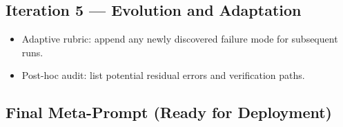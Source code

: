 \documentclass[11pt,a4paper]{article}
\numberwithin{equation}{section}
\begin{document}
\subsection*{Iteration 5 --- Evolution and Adaptation}
\begin{summarybox}[title={Changes Introduced: Adaptive Rubric and Post-Hoc Audit}]
\begin{itemize}
  \item Adaptive rubric: append any newly discovered failure mode for subsequent runs.
  \item Post-hoc audit: list potential residual errors and verification paths.
\end{itemize}
\end{summarybox}

\subsection*{Final Meta-Prompt (Ready for Deployment)}
\end{document}
